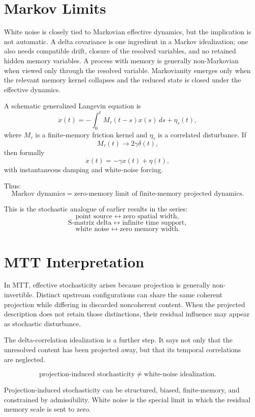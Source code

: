 \documentclass[11pt]{article}
\begin{document}
\section{Markov Limits}

White noise is closely tied to Markovian effective dynamics, but the implication is not automatic. A delta covariance is one ingredient in a Markov idealization; one also needs compatible drift, closure of the resolved variables, and no retained hidden memory variables. A process with memory is generally non-Markovian when viewed only through the resolved variable. Markovianity emerges only when the relevant memory kernel collapses and the reduced state is closed under the effective dynamics.

A schematic generalized Langevin equation is
\[
\dot x(t)
=
-\int_0^t M_\tau(t-s)x(s)\,ds+\eta_\tau(t),
\]
where \(M_\tau\) is a finite-memory friction kernel and \(\eta_\tau\) is a correlated disturbance. If
\[
M_\tau(t)\to 2\gamma\delta(t),
\]
then formally
\[
\dot x(t)=-\gamma x(t)+\eta(t),
\]
with instantaneous damping and white-noise forcing.

Thus:
\[
\boxed{
\text{Markov dynamics}=
\text{zero-memory limit of finite-memory projected dynamics}.
}
\]

This is the stochastic analogue of earlier results in the series:
\[
\text{point source} \leftrightarrow \text{zero spatial width},
\]
\[
\text{S-matrix delta} \leftrightarrow \text{infinite time support},
\]
\[
\text{white noise} \leftrightarrow \text{zero memory width}.
\]

\section{MTT Interpretation}

In MTT, effective stochasticity arises because projection is generally non-invertible. Distinct upstream configurations can share the same coherent projection while differing in discarded noncoherent content. When the projected description does not retain those distinctions, their residual influence may appear as stochastic disturbance.

The delta-correlation idealization is a further step. It says not only that the unresolved content has been projected away, but that its temporal correlations are neglected.

\[
\boxed{
\text{projection-induced stochasticity}
\neq
\text{white-noise idealization}.
}
\]

Projection-induced stochasticity can be structured, biased, finite-memory, and constrained by admissibility. White noise is the special limit in which the residual memory scale is sent to zero.
\end{document}
